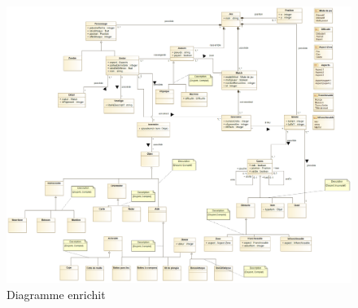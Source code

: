 \begin{figure}
    \centering
	\includegraphics[width=\paperwidth]{assets/Jeu}
	\caption{Diagramme enrichit}
	\label{fig:Jeu}
\end{figure}

\newpage